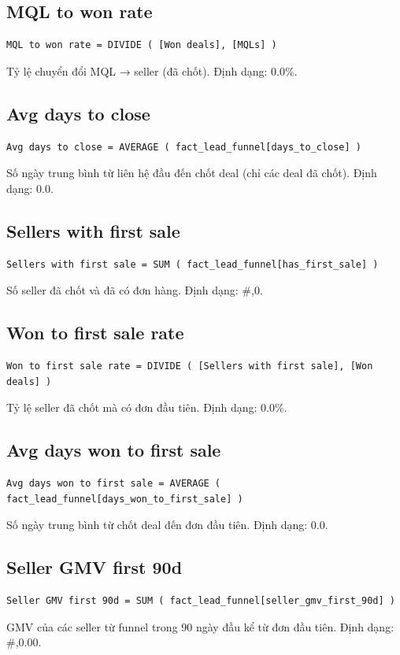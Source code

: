 \subsection*{MQL to won rate}
\begin{lstlisting}[language={}]
MQL to won rate = DIVIDE ( [Won deals], [MQLs] )
\end{lstlisting}
Tỷ lệ chuyển đổi MQL → seller (đã chốt). Định dạng: 0.0\%.

\subsection*{Avg days to close}
\begin{lstlisting}[language={}]
Avg days to close = AVERAGE ( fact_lead_funnel[days_to_close] )
\end{lstlisting}
Số ngày trung bình từ liên hệ đầu đến chốt deal (chỉ các deal đã chốt). Định dạng: 0.0.

\subsection*{Sellers with first sale}
\begin{lstlisting}[language={}]
Sellers with first sale = SUM ( fact_lead_funnel[has_first_sale] )
\end{lstlisting}
Số seller đã chốt và đã có đơn hàng. Định dạng: \#,0.

\subsection*{Won to first sale rate}
\begin{lstlisting}[language={}]
Won to first sale rate = DIVIDE ( [Sellers with first sale], [Won deals] )
\end{lstlisting}
Tỷ lệ seller đã chốt mà có đơn đầu tiên. Định dạng: 0.0\%.

\subsection*{Avg days won to first sale}
\begin{lstlisting}[language={}]
Avg days won to first sale = AVERAGE ( fact_lead_funnel[days_won_to_first_sale] )
\end{lstlisting}
Số ngày trung bình từ chốt deal đến đơn đầu tiên. Định dạng: 0.0.

\subsection*{Seller GMV first 90d}
\begin{lstlisting}[language={}]
Seller GMV first 90d = SUM ( fact_lead_funnel[seller_gmv_first_90d] )
\end{lstlisting}
GMV của các seller từ funnel trong 90 ngày đầu kể từ đơn đầu tiên. Định dạng: \#,0.00.

